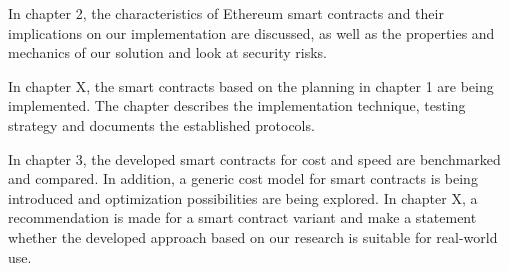 In chapter 2, the characteristics of Ethereum smart contracts and their implications on our implementation are discussed, as well as the properties and mechanics of our solution and look at security risks.

In chapter X, the smart contracts based on the planning in chapter 1 are being implemented. The chapter describes the implementation technique, testing strategy and documents the established protocols.

In chapter 3, the developed smart contracts for cost and speed are benchmarked and compared. In addition, a generic cost model for smart contracts is being introduced and optimization possibilities are being explored.
In chapter X, a recommendation is made for a smart contract variant and make a statement whether the developed approach based on our research is suitable for real-world use.
